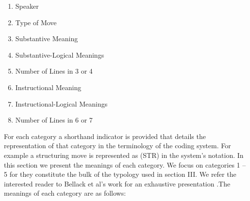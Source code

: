 \documentclass[conference]{IEEEtran}
\begin{document}
\begin{enumerate}
  \item Speaker
  \item Type of Move
  \item Substantive Meaning
  \item Substantive-Logical Meanings
  \item Number of Lines in 3 or 4
  \item Instructional Meaning
  \item Instructional-Logical Meanings
  \item Number of Lines in 6 or 7
\end{enumerate}

For each category a shorthand indicator is provided that details the
representation of that category in the terminology of the coding system.
For example a structuring move is represented as (STR) in the system's
notation. In this section we present the meanings of each category. We focus on
categories 1 -- 5 for they constitute the bulk of the typology used in section
III. We refer the interested reader to Bellack et al's work for an
exhaustive presentation \cite{bellack1966language}.The meanings of each category are as follows:
\end{document}
